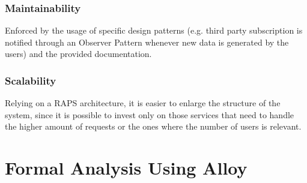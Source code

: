 \documentclass[12pt,a4paper]{article}
\begin{document}
	\subsubsection{Maintainability}
	Enforced by the usage of specific design patterns (e.g. third party subscription is notified through an Observer Pattern whenever new data is generated by the users) and the provided documentation.
	\subsubsection{Scalability}
	Relying on a RAPS architecture, it is easier to enlarge the structure of the system, since it is possible to invest only on those services that need to handle the higher amount of requests or the ones where the number of users is relevant.


	\newpage
	\section{Formal Analysis Using Alloy}

	\newpage
\end{document}
